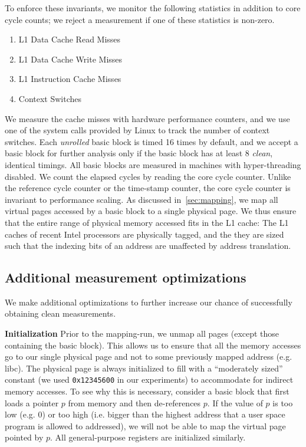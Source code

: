 To enforce these invariants, we monitor the following statistics in addition to core cycle counts;
we reject a measurement if one of these statistics is non-zero. 
\begin{enumerate}
    \item L1 Data Cache Read Misses
    \item L1 Data Cache Write Misses
    \item L1 Instruction Cache Misses
    \item Context Switches
\end{enumerate}
We measure the cache misses with hardware performance counters, 
and we use one of the system calls provided by Linux to track the number of context switches. 
Each \textit{unrolled} basic block is timed 16 times by default,
and we accept a basic block for further analysis only if the basic block has at least 
8 \textit{clean}, identical timings.
All basic blocks are measured in machines with hyper-threading disabled.
We count the elapsed cycles by reading the core cycle counter.
Unlike the reference cycle counter or the time-stamp counter, the core cycle counter is invariant
to performance scaling.
As discussed in~\ref{sec:mapping}, we map all virtual pages accessed by 
a basic block to a single physical page.
We thus ensure that the entire range of physical memory accessed fits in the L1 cache: The L1 caches of recent Intel processors are physically tagged, and
the they are sized such that the indexing bits of an address are unaffected by address translation.

\subsection{Additional measurement optimizations}
We make additional optimizations to further increase our chance
of successfully obtaining clean measurements.

\textbf{Initialization} 
Prior to the mapping-run,
we unmap all pages (except those containing the basic block).
This allows us to ensure that all the memory accesses go to our single 
physical page and not to some previously mapped address (e.g. libc).
The physical page is
always initialized to fill with a “moderately sized” constant
(we used \verb|0x12345600| in our experiments)
to accommodate for indirect memory accesses.
To see why this is necessary,
consider a basic block that first loads a pointer $p$ from memory
and then de-references $p$.
If the value of $p$ is too low (e.g. 0)
or too high
(i.e. bigger than the highest address that
a user space program is allowed to addressed),
we will not be able to map the virtual page pointed by $p$.
All general-purpose registers are initialized similarly.

